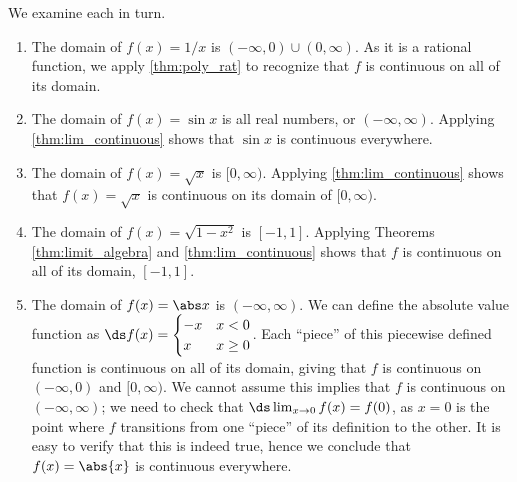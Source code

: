 {We examine each in turn.
\begin{enumerate}
	\item	The domain of $f(x) = 1/x$ is $(-\infty,0) \cup (0,\infty)$. As it is a rational function, we apply \autoref{thm:poly_rat} to recognize that $f$ is continuous on all of its domain.
	\item	The domain of $f(x) = \sin x$ is all real numbers, or $(-\infty,\infty)$. Applying \autoref{thm:lim_continuous} shows that $\sin x$ is continuous everywhere.
	\item	The domain of $f(x) = \sqrt{x}$ is $[0,\infty)$. Applying \autoref{thm:lim_continuous} shows that $f(x) = \sqrt{x}$ is continuous on its domain of $[0,\infty)$.
	\item	The domain of $f(x) = \sqrt{1-x^2}$ is $[-1,1]$. Applying Theorems \ref{thm:limit_algebra} and \ref{thm:lim_continuous} shows that $f$ is continuous on all of its domain, $[-1,1]$.
	\item	The domain of $f(x) = \abs x$ is $(-\infty,\infty)$. We can define the absolute value function as $\ds f(x) = \begin{cases}-x & x<0 \\ x & x\geq 0\end{cases}$. Each ``piece'' of this piecewise defined function is continuous on all of its domain, giving that $f$ is continuous on $(-\infty,0)$ and $[0,\infty)$. We cannot assume this implies that $f$ is continuous on $(-\infty,\infty)$; we need to check that $\ds \lim_{x\to 0}f(x) = f(0)$, as $x=0$ is the point where $f$ transitions from one ``piece'' of its definition to the other. It is easy to verify that this is indeed true, hence we conclude that $f(x) = \abs{x}$ is continuous everywhere.\eoehere
\end{enumerate}}

